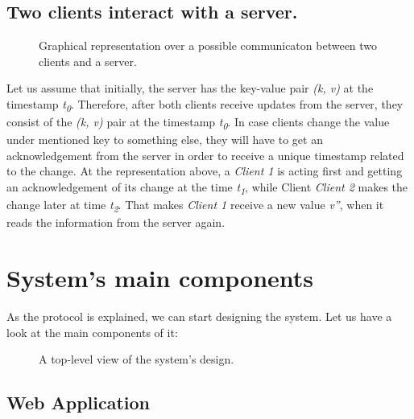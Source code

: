 \subsection{Two clients interact with a server.}

\begin{figure}[!htb]
    \begin{center}
    \def\svgwidth{\linewidth}
    
    \caption {Graphical representation over a possible communicaton between two clients and a server.}
    \label{fig:design4}
\end{center}
\end{figure}

Let us assume that initially, the server has the key-value pair \textit{(k, v)} at the timestamp \textit{t\textsubscript{0}}. Therefore, after both clients receive updates from the server, they consist of the \textit{(k, v)} pair at the timestamp \textit{t\textsubscript{0}}. In case clients change the value under mentioned key to something else, they will have to get an acknowledgement from the server in order to receive a unique timestamp related to the change. At the representation above, a \textit{Client 1} is acting first and getting an acknowledgement of its change at the time \textit{t\textsubscript{1}}, while Client \textit{Client 2} makes the change later at time \textit{t\textsubscript{2}}. That makes \textit{Client 1} receive a new value \textit{v''}, when it reads the information from the server again.

\section{System's main components}


As the protocol is explained, we can start designing the system. Let us have a look at the main components of it:


\begin{figure}[!htb]
    \begin{center}
        \setlength{\fboxsep}{15pt}%
        \setlength{\fboxrule}{1pt}%
    \def\svgwidth{\linewidth}
    \fbox{}
    \caption {A top-level view of the system's design.}
    \label{fig:design5}
\end{center}
\end{figure}

\subsection{Web Application}

